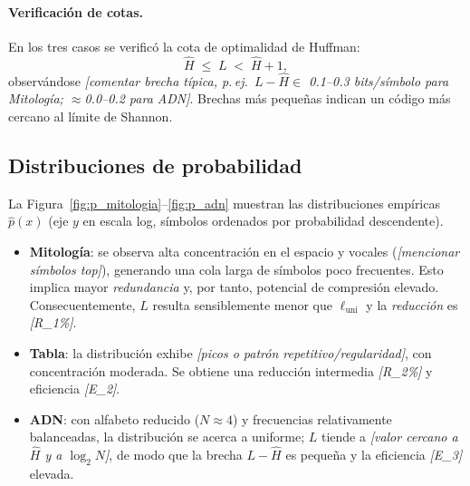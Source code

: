 \documentclass[12pt, a4paper]{article}
\begin{document}
\paragraph{Verificación de cotas.}
En los tres casos se verificó la cota de optimalidad de Huffman:
\[
\hat H \;\le\; L \;<\; \hat H + 1,
\]
observándose \emph{[comentar brecha típica, p.\,ej.\ $L-\hat H\in$ 0.1--0.3 bits/símbolo para Mitología; $\approx$0.0--0.2 para ADN]}.
Brechas más pequeñas indican un código más cercano al límite de Shannon.

\subsection*{Distribuciones de probabilidad}
La Figura~\ref{fig:p_mitologia}--\ref{fig:p_adn} muestran las distribuciones empíricas $\hat p(x)$ (eje $y$ en escala log, símbolos ordenados por probabilidad descendente).
\begin{itemize}
  \item \textbf{Mitología}: se observa alta concentración en el espacio y vocales (\emph{[mencionar símbolos top]}), generando una cola larga de símbolos poco frecuentes. Esto implica mayor \emph{redundancia} y, por tanto, potencial de compresión elevado. Consecuentemente, $L$ resulta sensiblemente menor que $\ell_{\text{uni}}$ y la \emph{reducción} es \emph{[R\_1\%]}.
  \item \textbf{Tabla}: la distribución exhibe \emph{[picos o patrón repetitivo/regularidad]}, con concentración moderada. Se obtiene una reducción intermedia \emph{[R\_2\%]} y eficiencia \emph{[E\_2]}.
  \item \textbf{ADN}: con alfabeto reducido ($N\approx 4$) y frecuencias relativamente balanceadas, la distribución se acerca a uniforme; $L$ tiende a \emph{[valor cercano a $\hat H$ y a $\log_2 N$]}, de modo que la brecha $L-\hat H$ es pequeña y la eficiencia \emph{[E\_3]} elevada.
\end{itemize}

%
%
\end{document}
